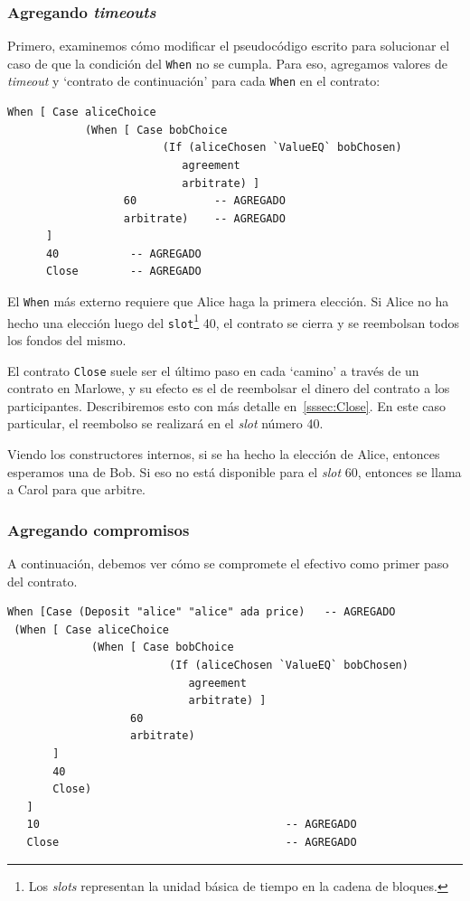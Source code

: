 \documentclass[12pt]{book}
\begin{document}
\subsubsection{Agregando \textit{timeouts}}

Primero, examinemos cómo modificar el pseudocódigo escrito para solucionar el caso de que la condición del \texttt{When} no se cumpla. Para eso, agregamos valores de \textit{timeout} y `contrato de continuación' para cada \texttt{When} en el contrato:

\begin{lstlisting}[style=Haskell-cardano, language=Marlowe, caption=Pseudocódigo con timeouts.]
When [ Case aliceChoice
            (When [ Case bobChoice
                        (If (aliceChosen `ValueEQ` bobChosen)
                           agreement
                           arbitrate) ]
                  60            -- AGREGADO
                  arbitrate)    -- AGREGADO
      ]
      40           -- AGREGADO
      Close        -- AGREGADO
\end{lstlisting}

El \texttt{When} más externo requiere que Alice haga la primera elección. Si Alice no ha hecho una elección luego del \texttt{slot}\footnote{Los \textit{slots} representan la unidad básica de tiempo en la cadena de bloques.} 40, el contrato se cierra y se reembolsan todos los fondos del mismo.

El contrato \texttt{Close} suele ser el último paso en cada `camino' a través de un contrato en Marlowe, y su efecto es el de reembolsar el dinero del contrato a los participantes. Describiremos esto con más detalle en~\ref{sssec:Close}. En este caso particular, el reembolso se realizará en el \textit{slot} número 40.

Viendo los constructores internos, si se ha hecho la elección de Alice, entonces esperamos una de Bob. Si eso no está disponible para el \textit{slot} 60, entonces se llama a Carol para que arbitre. 


\subsubsection{Agregando compromisos}

A continuación, debemos ver cómo se compromete el efectivo como primer paso del contrato.

\begin{minipage}{\linewidth}
\begin{lstlisting}[style=Haskell-cardano, language=Marlowe, caption=Pseudocódigo con validación de fondos.]
When [Case (Deposit "alice" "alice" ada price)   -- AGREGADO
 (When [ Case aliceChoice
             (When [ Case bobChoice
                         (If (aliceChosen `ValueEQ` bobChosen)
                            agreement
                            arbitrate) ]
                   60
                   arbitrate)
       ]
       40
       Close)
   ]
   10                                      -- AGREGADO
   Close                                   -- AGREGADO
\end{lstlisting}
\end{minipage}
\end{document}
